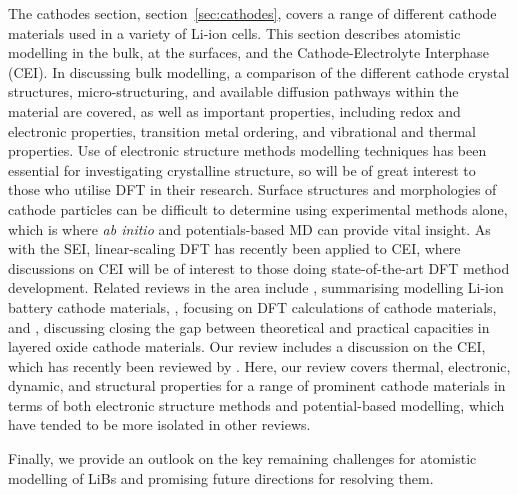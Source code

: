 \documentclass[../main.tex]{subfiles}
\begin{document}
The cathodes section, section~\ref{sec:cathodes}, covers a range of different cathode materials used in a variety of Li-ion cells. This section describes atomistic modelling in the bulk, at the surfaces, and the Cathode-Electrolyte Interphase (CEI). In discussing bulk modelling, a comparison of the different cathode crystal structures, micro-structuring, and available diffusion pathways within the material are covered, as well as important properties, including redox and electronic properties, transition metal ordering, and vibrational and thermal properties. Use of electronic structure methods modelling techniques has been essential for investigating crystalline structure, so will be of great interest to those who utilise DFT in their research. Surface structures and morphologies of cathode particles can be difficult to determine using experimental methods alone, which is where \textit{ab initio} and potentials-based MD can provide vital insight. As with the SEI, linear-scaling DFT has recently been applied to CEI, where discussions on CEI will be of interest to those doing state-of-the-art DFT method development. Related reviews in the area include \citeauthor{ma2018computer}, \cite{ma2018computer} summarising modelling Li-ion battery cathode materials, \citeauthor{yan2014review}, \cite{yan2014review} focusing on DFT calculations of cathode materials, and \citeauthor{wang2018reviving}, \cite{wang2018reviving} discussing closing the gap between theoretical and practical capacities in layered oxide cathode materials. Our review includes a discussion on the CEI, which has recently been reviewed by \citeauthor{maleki2019controllable}. \cite{maleki2019controllable} Here, our review covers thermal, electronic, dynamic, and structural properties for a range of prominent cathode materials in terms of both electronic structure methods and potential-based modelling, which have tended to be more isolated in other reviews.

Finally, we provide an outlook on the key remaining challenges for atomistic modelling of LiBs and promising future directions for resolving them.
\end{document}
